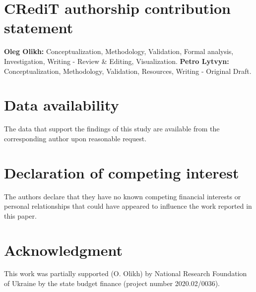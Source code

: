 \documentclass[final,3p,times,twocolumn,authoryear]{elsarticle}
\begin{document}

\section*{CRediT authorship contribution statement}
\textbf{Oleg Olikh:} Conceptualization, Methodology, Validation, Formal analysis, Investigation, Writing - Review \& Editing, Visualization.
\textbf{Petro Lytvyn:} Conceptualization, Methodology, Validation, Resources, Writing - Original Draft.


\section*{Data availability}

The data that support the findings of this study are available from the corresponding author upon reasonable request.

\section*{Declaration of competing interest}

The authors declare that they have no known competing financial interests or personal relationships that could have appeared to influence the work reported in this paper.


\section*{Acknowledgment}

This work was partially supported (O. Olikh) by National Research Foundation of Ukraine
by the state budget finance (project number 2020.02/0036).


%
%
%



\end{document}
